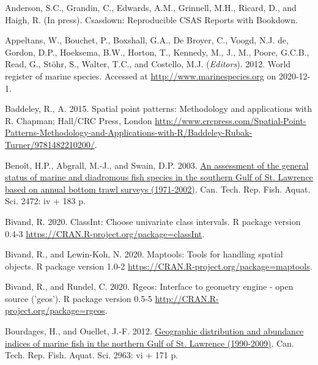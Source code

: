 \documentclass[12pt]{article}\usepackage[]{graphicx}\usepackage[]{color}
\begin{document}
\noindent \vspace{-2em} \setlength{\parindent}{-0.2in} \setlength{\leftskip}{0.2in} \setlength{\parskip}{8pt}

\hypertarget{refs}{}
\leavevmode\hypertarget{ref-R:csasdown}{}%
Anderson, S.C., Grandin, C., Edwards, A.M., Grinnell, M.H., Ricard, D., and Haigh, R. (In press). Csasdown: Reproducible CSAS Reports with Bookdown.

\leavevmode\hypertarget{ref-WoRMS}{}%
Appeltans, W., Bouchet, P., Boxshall, G.A., De Broyer, C., Voogd, N.J. de, Gordon, D.P., Hoeksema, B.W., Horton, T., Kennedy, M., J., M., Poore, G.C.B., Read, G., Stöhr, S., Walter, T.C., and Costello, M.J. (\emph{Editors}). 2012. World register of marine species. Accessed at \url{http://www.marinespecies.org} on 2020-12-1.

\leavevmode\hypertarget{ref-R:package:spatstat}{}%
Baddeley, R., A. 2015. Spatial point patterns: Methodology and applications with R. Chapman; Hall/CRC Press, London \url{http://www.crcpress.com/Spatial-Point-Patterns-Methodology-and-Applications-with-R/Baddeley-Rubak-Turner/9781482210200/}.

\leavevmode\hypertarget{ref-Benoit:etal:2003:techreport}{}%
Benoît, H.P., Abgrall, M.-J., and Swain, D.P. 2003. \href{http://publications.gc.ca/site/eng/428386/publication.html}{An assessment of the general status of marine and diadromous fish species in the southern Gulf of St. Lawrence based on annual bottom trawl surveys (1971-2002)}. Can. Tech. Rep. Fish. Aquat. Sci. 2472: iv + 183 p.

\leavevmode\hypertarget{ref-R:package:classInt}{}%
Bivand, R. 2020. ClassInt: Choose univariate class intervals. R package version 0.4-3 \url{https://CRAN.R-project.org/package=classInt}.

\leavevmode\hypertarget{ref-R:package:maptools}{}%
Bivand, R., and Lewin-Koh, N. 2020. Maptools: Tools for handling spatial objects. R package version 1.0-2 \url{https://CRAN.R-project.org/package=maptools}.

\leavevmode\hypertarget{ref-R:package:rgeos}{}%
Bivand, R., and Rundel, C. 2020. Rgeos: Interface to geometry engine - open source ('geos'). R package version 0.5-5 \url{http://CRAN.R-project.org/package=rgeos}.

\leavevmode\hypertarget{ref-Bourdages:NGatlas:2012}{}%
Bourdages, H., and Ouellet, J.-F. 2012. \href{http://publications.gc.ca/site/eng/425663/publication.html}{Geographic distribution and abundance indices of marine fish in the northern Gulf of St. Lawrence (1990-2009)}. Can. Tech. Rep. Fish. Aquat. Sci. 2963: vi + 171 p.
\end{document}

